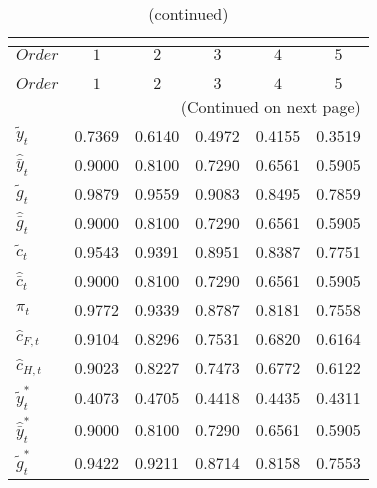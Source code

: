  
\begin{center}
\begin{longtable}{lccccc} 
\caption{COEFFICIENTS OF AUTOCORRELATION}\\
 \label{Table:th_autocorr_matrix}\\
\toprule 
$Order                $	 & 	 $         1$	 & 	 $         2$	 & 	 $         3$	 & 	 $         4$	 & 	 $         5$\\
\midrule \endfirsthead 
\caption{(continued)}\\
 \toprule \\ 
$Order                $	 & 	 $         1$	 & 	 $         2$	 & 	 $         3$	 & 	 $         4$	 & 	 $         5$\\
\midrule \endhead 
\midrule \multicolumn{6}{r}{(Continued on next page)} \\ \bottomrule \endfoot 
\bottomrule \endlastfoot 
${\tilde y_t}         $	 & 	    0.7369	 & 	    0.6140	 & 	    0.4972	 & 	    0.4155	 & 	    0.3519 \\ 
${\hat {\bar y}_t}    $	 & 	    0.9000	 & 	    0.8100	 & 	    0.7290	 & 	    0.6561	 & 	    0.5905 \\ 
${\tilde g_t}         $	 & 	    0.9879	 & 	    0.9559	 & 	    0.9083	 & 	    0.8495	 & 	    0.7859 \\ 
${\hat {\bar g}_t}    $	 & 	    0.9000	 & 	    0.8100	 & 	    0.7290	 & 	    0.6561	 & 	    0.5905 \\ 
${\tilde c_t}         $	 & 	    0.9543	 & 	    0.9391	 & 	    0.8951	 & 	    0.8387	 & 	    0.7751 \\ 
${\hat {\bar c}_t}    $	 & 	    0.9000	 & 	    0.8100	 & 	    0.7290	 & 	    0.6561	 & 	    0.5905 \\ 
${\pi_t}              $	 & 	    0.9772	 & 	    0.9339	 & 	    0.8787	 & 	    0.8181	 & 	    0.7558 \\ 
${\hat c_{F,t}}       $	 & 	    0.9104	 & 	    0.8296	 & 	    0.7531	 & 	    0.6820	 & 	    0.6164 \\ 
${\hat c_{H,t}}       $	 & 	    0.9023	 & 	    0.8227	 & 	    0.7473	 & 	    0.6772	 & 	    0.6122 \\ 
${\tilde y_t^*}       $	 & 	    0.4073	 & 	    0.4705	 & 	    0.4418	 & 	    0.4435	 & 	    0.4311 \\ 
${\hat {\bar y}_t^*}  $	 & 	    0.9000	 & 	    0.8100	 & 	    0.7290	 & 	    0.6561	 & 	    0.5905 \\ 
${\tilde g_t^*}       $	 & 	    0.9422	 & 	    0.9211	 & 	    0.8714	 & 	    0.8158	 & 	    0.7553 \\ 

\end{longtable}
\end{center}
